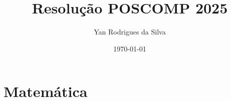 \documentclass[12pt, a4paper]{article}
\title{Resolução POSCOMP 2025}
\author{Yan Rodrigues da Silva}
\date{\today}
\begin{document}
\maketitle
\thispagestyle{empty}
\tableofcontents
\newpage

\section{Matemática}










\end{document}
